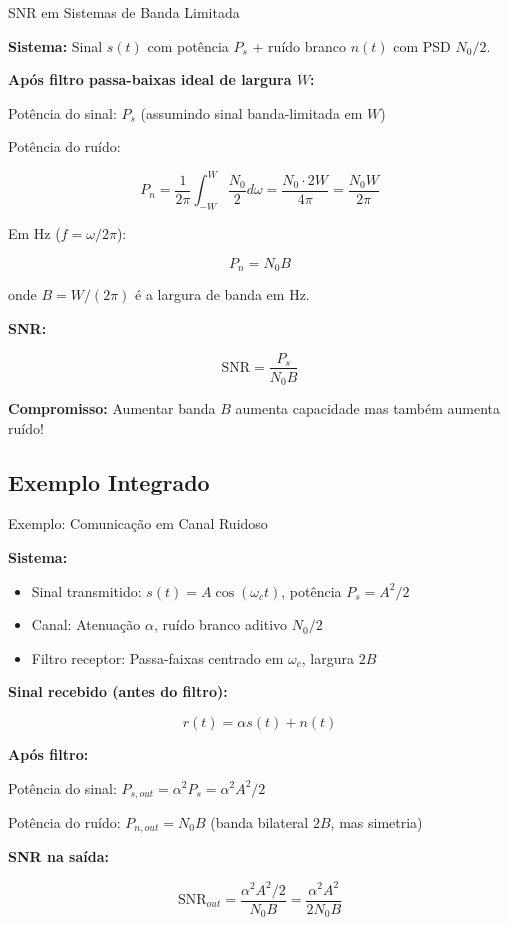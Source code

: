 \begin{frame}{SNR em Sistemas de Banda Limitada}

\textbf{Sistema:} Sinal $s(t)$ com potência $P_s$ + ruído branco $n(t)$ com PSD $N_0/2$.

\textbf{Após filtro passa-baixas ideal de largura $W$:}

Potência do sinal: $P_s$ (assumindo sinal banda-limitada em $W$)

Potência do ruído:

\[
P_n = \frac{1}{2\pi} \int_{-W}^{W} \frac{N_0}{2} d\omega = \frac{N_0 \cdot 2W}{4\pi} = \frac{N_0 W}{2\pi}
\]

Em Hz ($f = \omega/2\pi$):

\[
P_n = N_0 B
\]

onde $B = W/(2\pi)$ é a largura de banda em Hz.

\textbf{SNR:}

\[
\text{SNR} = \frac{P_s}{N_0 B}
\]

\textbf{Compromisso:} Aumentar banda $B$ aumenta capacidade mas também aumenta ruído!

\end{frame}


\subsection{Exemplo Integrado}

\begin{frame}{Exemplo: Comunicação em Canal Ruidoso}

\textbf{Sistema:}

\begin{itemize}
\item Sinal transmitido: $s(t) = A\cos(\omega_c t)$, potência $P_s = A^2/2$
\item Canal: Atenuação $\alpha$, ruído branco aditivo $N_0/2$
\item Filtro receptor: Passa-faixas centrado em $\omega_c$, largura $2B$
\end{itemize}

\textbf{Sinal recebido (antes do filtro):}

\[
r(t) = \alpha s(t) + n(t)
\]

\textbf{Após filtro:}

Potência do sinal: $P_{s,out} = \alpha^2 P_s = \alpha^2 A^2/2$

Potência do ruído: $P_{n,out} = N_0 B$ (banda bilateral $2B$, mas simetria)

\textbf{SNR na saída:}

\[
\text{SNR}_{out} = \frac{\alpha^2 A^2/2}{N_0 B} = \frac{\alpha^2 A^2}{2N_0 B}
\]

\end{frame}

